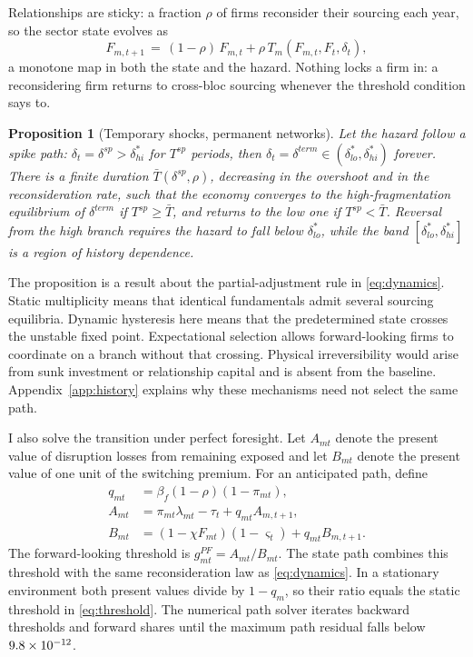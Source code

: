 \documentclass[11pt]{article}
\newtheorem{proposition}{Proposition}
\theoremstyle{definition}
\begin{document}
Relationships are sticky: a fraction $\rho$ of firms reconsider their sourcing each year, so the sector state evolves as
\begin{equation}
F_{m,t+1} \,=\, (1 - \rho)\,F_{m,t} + \rho\, T_m(F_{m,t}, F_t, \delta_t),
\label{eq:dynamics}
\end{equation}
a monotone map in both the state and the hazard. Nothing locks a firm in: a reconsidering firm returns to cross-bloc sourcing whenever the threshold condition says to.

\begin{proposition}[Temporary shocks, permanent networks]\label{prop:hysteresis}
Let the hazard follow a spike path: $\delta_t = \delta^{sp} > \delta^*_{hi}$ for $T^{sp}$ periods, then $\delta_t = \delta^{term} \in (\delta^*_{lo}, \delta^*_{hi})$ forever. There is a finite duration $\bar T(\delta^{sp}, \rho)$, decreasing in the overshoot and in the reconsideration rate, such that the economy converges to the high-fragmentation equilibrium of $\delta^{term}$ if $T^{sp} \ge \bar T$, and returns to the low one if $T^{sp} < \bar T$. Reversal from the high branch requires the hazard to fall below $\delta^*_{lo}$, while the band $[\delta^*_{lo}, \delta^*_{hi}]$ is a region of history dependence.
\end{proposition}

The proposition is a result about the partial-adjustment rule in \eqref{eq:dynamics}. Static multiplicity means that identical fundamentals admit several sourcing equilibria. Dynamic hysteresis here means that the predetermined state crosses the unstable fixed point. Expectational selection allows forward-looking firms to coordinate on a branch without that crossing. Physical irreversibility would arise from sunk investment or relationship capital and is absent from the baseline. Appendix~\ref{app:history} explains why these mechanisms need not select the same path.

I also solve the transition under perfect foresight. Let $A_{mt}$ denote the present value of disruption losses from remaining exposed and let $B_{mt}$ denote the present value of one unit of the switching premium. For an anticipated path, define
\begin{align}
q_{mt}&=\beta_f(1-\rho)(1-\pi_{mt}), \nonumber\\
A_{mt}&=\pi_{mt}\lambda_{mt}-\tau_t+q_{mt}A_{m,t+1}, \nonumber\\
B_{mt}&=(1-\chi F_{mt})(1-\varsigma_t)+q_{mt}B_{m,t+1}.
\label{eq:pf-recursion}
\end{align}
The forward-looking threshold is $g^{PF}_{mt}=A_{mt}/B_{mt}$. The state path combines this threshold with the same reconsideration law as \eqref{eq:dynamics}. In a stationary environment both present values divide by $1-q_m$, so their ratio equals the static threshold in \eqref{eq:threshold}. The numerical path solver iterates backward thresholds and forward shares until the maximum path residual falls below \(9.8\times10^{-12}\).
\end{document}
